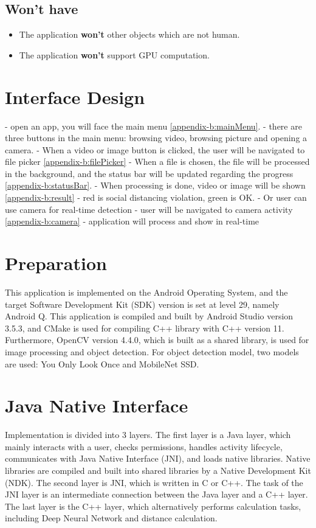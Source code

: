         \subsection{Won't have}
            \begin{itemize}
                \item The application \textbf{won't} other objects which are not human.
                \item The application \textbf{won't} support GPU computation.
            \end{itemize}

    \section{Interface Design}
        - open an app, you will face the main menu \ref{appendix-b:mainMenu}.
        - there are three buttons in the main menu: browsing video, browsing picture and opening a camera.
        - When a video or image button is clicked, the user will be navigated to file picker \ref{appendix-b:filePicker}
        - When a file is chosen, the file will be processed in the background, and the status bar will be updated regarding the progress \ref{appendix-b:statusBar}.
        - When processing is done, video or image will be shown \ref{appendix-b:result}
        - red is social distancing  violation, green is OK.
        - Or user can use camera for real-time detection
        - user will be navigated to camera activity \ref{appendix-b:camera}
        - application will process and show in real-time

    \section{Preparation}
        This application is implemented on the Android Operating System,
        and the target Software Development Kit (SDK) version is set at level 29, namely Android Q.
        This application is compiled and built by Android Studio version 3.5.3,
        and CMake is used for compiling C++ library with C++ version 11.
        Furthermore, OpenCV version 4.4.0, which is built as a shared library, is used for image processing and object detection.
        For object detection model, two models are used: You Only Look Once and MobileNet SSD.

    \section{Java Native Interface}
        Implementation is divided into 3 layers.
            The first layer is a Java layer, which mainly interacts with a user,
            checks permissions, handles activity lifecycle, communicates with Java Native Interface (JNI), and loads native libraries.
                Native libraries are compiled and built into shared libraries by a Native Development Kit (NDK).
            The second layer is JNI, which is written in C or C++.
                The task of the JNI layer is an intermediate connection between the Java layer and a C++ layer.
            The last layer is the C++ layer, which alternatively performs calculation tasks,
            including Deep Neural Network and distance calculation.

